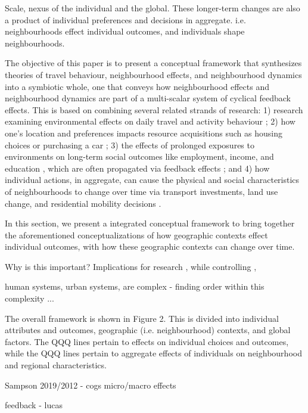 Scale, nexus of the individual and the global. 
These longer-term changes are also a product of individual preferences and decisions in aggregate. i.e. neighbourhoods effect individual outcomes, and individuals shape neighbourhoods.


The objective of this paper is to present a conceptual framework that synthesizes theories of travel behaviour, neighbourhood effects, and neighbourhood dynamics into a symbiotic whole, one that conveys how neighbourhood effects and neighbourhood dynamics are part of a multi-scalar system of cyclical feedback effects. This is based on combining several related strands of research: 1) research examining environmental effects on daily travel and activity behaviour \cite{hanson_determinants_1982,ewing_travel_2010}; 2) how one's location and preferences impacts resource acquisitions such as housing choices or purchasing a car \cite{lee_neighborhood_1994,klein_millennials_2017}; 3) the effects of prolonged exposures to environments on long-term social outcomes like employment, income, and education \cite{sampson_assessing_2002,chetty_effects_2016}, which are often propagated via feedback effects \cite{wilson_truly_2012,lucas_transport_2012}; and 4) how individual actions, in aggregate, can cause the physical and social characteristics of neighbourhoods to change over time via transport investments, land use change, and residential mobility decisions \cite{wegener_land-use_2004,wilson_truly_2012,van_ham_understanding_2013}. 



In this section, we present a integrated conceptual framework to bring together the aforementioned conceptualizations of how geographic contexts effect individual outcomes, with how these geographic contexts can change over time. 

Why is this important? Implications for research , while controlling , 

human systems, urban systems, are complex - finding order within this complexity ...

The overall framework is shown in Figure 2. This is divided into individual attributes and outcomes, geographic (i.e. neighbourhood) contexts, and global factors. The QQQ lines pertain to effects on individual choices and outcomes, while the QQQ lines pertain to aggregate effects of individuals on neighbourhood and regional characteristics.

Sampson 2019/2012 - cogs micro/macro effects

feedback - lucas

